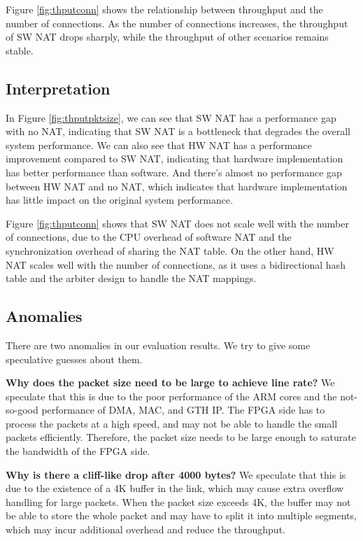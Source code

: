 Figure \ref{fig:thputconn} shows the relationship between throughput and the number of connections. As the number of connections increases, the throughput of SW NAT drops sharply, while the throughput of other scenarios remains stable. 

\subsection{Interpretation}

In Figure \ref{fig:thputpktsize}, we can see that SW NAT has a performance gap with no NAT, indicating that SW NAT is a bottleneck that degrades the overall system performance. We can also see that HW NAT has a performance improvement compared to SW NAT, indicating that hardware implementation has better performance than software. And there's almost no performance gap between HW NAT and no NAT, which indicates that hardware implementation has little impact on the original system performance.

Figure \ref{fig:thputconn} shows that SW NAT does not scale well with the number of connections, due to the CPU overhead of software NAT and the synchronization overhead of sharing the NAT table. On the other hand, HW NAT scales well with the number of connections, as it uses a bidirectional hash table and the arbiter design to handle the NAT mappings.

\subsection{Anomalies}
There are two anomalies in our evaluation results. We try to give some speculative guesses about them.

\textbf{Why does the packet size need to be large to achieve line rate?} We speculate that this is due to the poor performance of the ARM cores and the not-so-good performance of DMA, MAC, and GTH IP. The FPGA side has to process the packets at a high speed, and may not be able to handle the small packets efficiently. Therefore, the packet size needs to be large enough to saturate the bandwidth of the FPGA side.

\textbf{Why is there a cliff-like drop after 4000 bytes?} We speculate that this is due to the existence of a 4K buffer in the link, which may cause extra overflow handling for large packets. When the packet size exceeds 4K, the buffer may not be able to store the whole packet and may have to split it into multiple segments, which may incur additional overhead and reduce the throughput.



